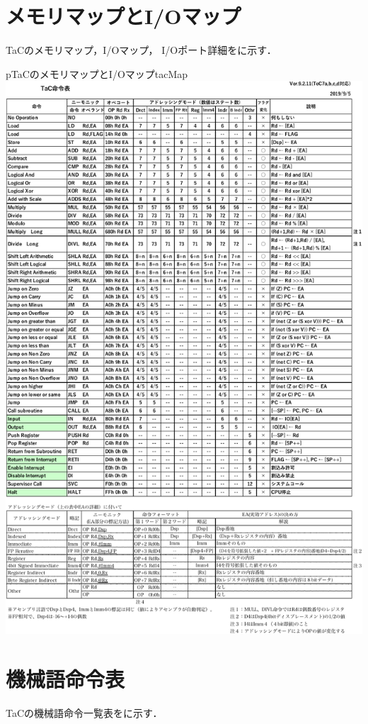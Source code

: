 \section{メモリマップとI/Oマップ}
TaCのメモリマップ，I/Oマップ，
I/Oポート詳細をに示す．

\begin{myfig}{p}{TaCのメモリマップとI/Oマップ}{tacMap}
  \includegraphics[scale=0.86,page=4]{Fig/TaCInst.pdf}
\end{myfig}

\section{機械語命令表}
TaCの機械語命令一覧表をに示す．

